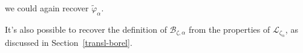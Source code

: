 \documentclass{article}
\theoremstyle{definition}
\newcommand{\maps}{\colon}
\newcommand{\C}{\mathbb{C}}
\newcommand{\series}[1]{\tilde{#1}}
\newcommand{\laplace}{\mathcal{L}}
\newcommand{\borel}{\mathcal{B}}
\theoremstyle{plain}
\begin{document}
we could again recover $\series{\varphi}_\alpha$. 

It's also possible to recover the definition of $\mathcal{B}_{\zeta,\alpha}$ from the properties of $\laplace_{\zeta_\alpha}$, as discussed in Section~\ref{transl-borel}.





\end{document}
